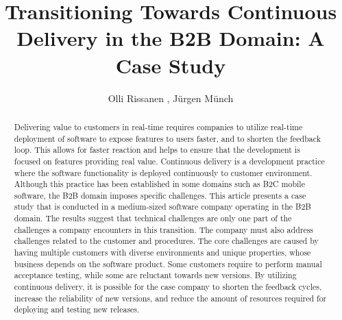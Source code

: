 \documentclass[lnbip]{svmultln}
\begin{document}
%
\mainmatter              %
%
\title{Transitioning Towards Continuous Delivery in the B2B Domain: A Case Study}
%
%
\author{Olli Rissanen , J{\"u}rgen M{\"u}nch 
}
%
%

\maketitle              %

\begin{abstract}        %
Delivering value to customers in real-time requires companies to utilize real-time deployment of software to expose features to users faster, and to shorten the feedback loop. This allows for faster reaction and helps to ensure that the development is focused on features providing real value. Continuous delivery is a development practice where the software functionality is deployed continuously to customer environment. Although this practice has been established in some domains such as B2C mobile software, the B2B domain imposes specific challenges. This article presents a case study that is conducted in a medium-sized software company operating in the B2B domain. The results suggest that technical challenges are only one part of the challenges a company encounters in this transition. The company must also address challenges related to the customer and procedures. The core challenges are caused by having multiple customers with diverse environments and unique properties, whose business depends on the software product. Some customers require to perform manual acceptance testing, while some are reluctant towards new versions. By utilizing continuous delivery, it is possible for the case company to shorten the feedback cycles, increase the reliability of new versions, and reduce the amount of resources required for deploying and testing new releases.


\end{abstract}
%
\end{document}
